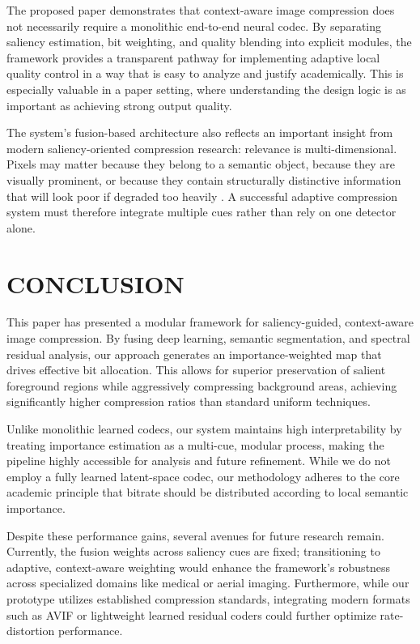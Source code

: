 \documentclass[11pt,                                                             
 superscriptaddress,twoside,
 amsmath,amssymb,
 aps, physrev
]{revtex4-2}
\begin{document}
The proposed paper demonstrates that context-aware image compression does not necessarily require a monolithic end-to-end neural codec. By separating saliency estimation, bit weighting, and quality blending into explicit modules, the framework provides a transparent pathway for implementing adaptive local quality control in a way that is easy to analyze and justify academically. This is especially valuable in a paper setting, where understanding the design logic is as important as achieving strong output quality.

The system's fusion-based architecture also reflects an important insight from modern saliency-oriented compression research: relevance is multi-dimensional. Pixels may matter because they belong to a semantic object, because they are visually prominent, or because they contain structurally distinctive information that will look poor if degraded too heavily \cite{xu2022acm, li2024ieee}. A successful adaptive compression system must therefore integrate multiple cues rather than rely on one detector alone.

\section{CONCLUSION}
This paper has presented a modular framework for saliency-guided, context-aware image compression. By fusing deep learning, semantic segmentation, and spectral residual analysis, our approach generates an importance-weighted map that drives effective bit allocation. This allows for superior preservation of salient foreground regions while aggressively compressing background areas, achieving significantly higher compression ratios than standard uniform techniques.

Unlike monolithic learned codecs, our system maintains high interpretability by treating importance estimation as a multi-cue, modular process, making the pipeline highly accessible for analysis and future refinement. While we do not employ a fully learned latent-space codec, our methodology adheres to the core academic principle that bitrate should be distributed according to local semantic importance.

Despite these performance gains, several avenues for future research remain. Currently, the fusion weights across saliency cues are fixed; transitioning to adaptive, context-aware weighting would enhance the framework’s robustness across specialized domains like medical or aerial imaging. Furthermore, while our prototype utilizes established compression standards, integrating modern formats such as AVIF or lightweight learned residual coders could further optimize rate-distortion performance.
\end{document}
